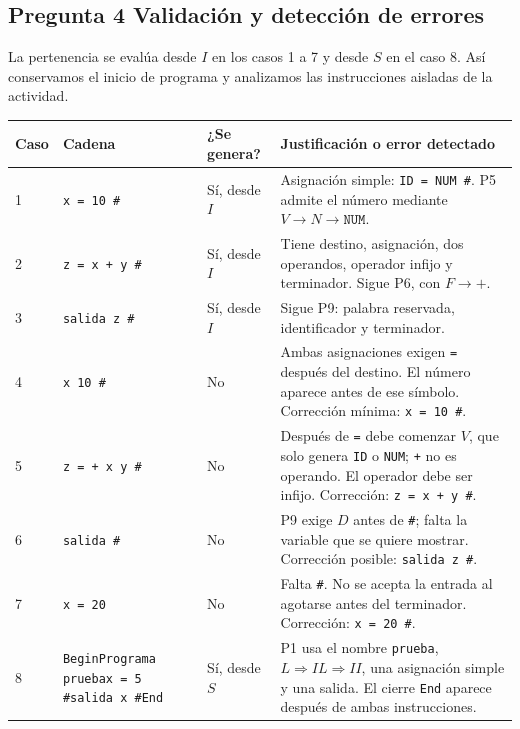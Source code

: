\documentclass[11pt,letterpaper]{article}
\newcommand{\cod}[1]{\texttt{#1}}
\newcommand{\cab}[1]{\rowcolor{cabecera}#1}
\begin{document}
\subsection{Pregunta 4 Validación y detección de errores}
La pertenencia se evalúa desde $I$ en los casos 1 a 7 y desde $S$ en el caso 8. Así conservamos el inicio de programa y analizamos las instrucciones aisladas de la actividad.
\begin{center}\small
\begin{tabularx}{\textwidth}{|p{1.0cm}|p{3.3cm}|p{1.5cm}|X|}\hline
\cab{\textbf{Caso}&\textbf{Cadena}&\textbf{¿Se genera?}&\textbf{Justificación o error detectado}}\\\hline
1&\cod{x = 10 \#}&Sí, desde $I$&Asignación simple: \cod{ID = NUM \#}. P5 admite el número mediante $V\to N\to\cod{NUM}$.\\\hline
2&\cod{z = x + y \#}&Sí, desde $I$&Tiene destino, asignación, dos operandos, operador infijo y terminador. Sigue P6, con $F\to\cod{+}$.\\\hline
3&\cod{salida z \#}&Sí, desde $I$&Sigue P9: palabra reservada, identificador y terminador.\\\hline
4&\cod{x 10 \#}&No&Ambas asignaciones exigen \cod{=} después del destino. El número aparece antes de ese símbolo. Corrección mínima: \cod{x = 10 \#}.\\\hline
5&\cod{z = + x y \#}&No&Después de \cod{=} debe comenzar $V$, que solo genera \cod{ID} o \cod{NUM}; \cod{+} no es operando. El operador debe ser infijo. Corrección: \cod{z = x + y \#}.\\\hline
6&\cod{salida \#}&No&P9 exige $D$ antes de \cod{\#}; falta la variable que se quiere mostrar. Corrección posible: \cod{salida z \#}.\\\hline
7&\cod{x = 20}&No&Falta \cod{\#}. No se acepta la entrada al agotarse antes del terminador. Corrección: \cod{x = 20 \#}.\\\hline
8&\cod{Begin}\newline\cod{Programa prueba}\newline\cod{x = 5 \#}\newline\cod{salida x \#}\newline\cod{End}&Sí, desde $S$&P1 usa el nombre \cod{prueba}, $L\Rightarrow IL\Rightarrow II$, una asignación simple y una salida. El cierre \cod{End} aparece después de ambas instrucciones.\\\hline
\end{tabularx}\end{center}
\end{document}
